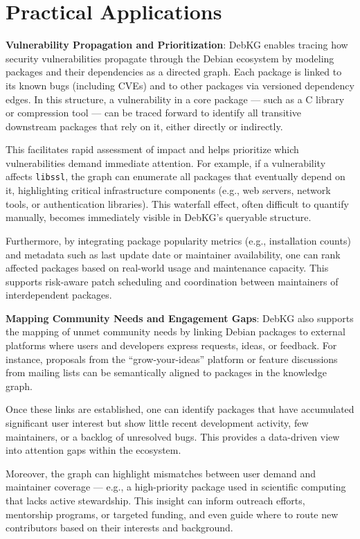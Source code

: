 \documentclass[10pt,oneside,a4paper, twocolumn]{article}
\begin{document}
    \section{Practical Applications}


    {\bf Vulnerability Propagation and Prioritization}: DebKG enables tracing how security vulnerabilities propagate through the Debian ecosystem by modeling packages and their dependencies as a directed graph. Each package is linked to its known bugs (including CVEs) and to other packages via versioned dependency edges. In this structure, a vulnerability in a core package — such as a C library or compression tool — can be traced forward to identify all transitive downstream packages that rely on it, either directly or indirectly.

    This facilitates rapid assessment of impact and helps prioritize which vulnerabilities demand immediate attention. For example, if a vulnerability affects \texttt{libssl}, the graph can enumerate all packages that eventually depend on it, highlighting critical infrastructure components (e.g., web servers, network tools, or authentication libraries). This waterfall effect, often difficult to quantify manually, becomes immediately visible in DebKG’s queryable structure.

    Furthermore, by integrating package popularity metrics (e.g., installation counts) and metadata such as last update date or maintainer availability, one can rank affected packages based on real-world usage and maintenance capacity. This supports risk-aware patch scheduling and coordination between maintainers of interdependent packages.

        {\bf Mapping Community Needs and Engagement Gaps}: DebKG also supports the mapping of unmet community needs by linking Debian packages to external platforms where users and developers express requests, ideas, or feedback. For instance, proposals from the “grow-your-ideas” platform or feature discussions from mailing lists can be semantically aligned to packages in the knowledge graph.

    Once these links are established, one can identify packages that have accumulated significant user interest but show little recent development activity, few maintainers, or a backlog of unresolved bugs. This provides a data-driven view into attention gaps within the ecosystem.

    Moreover, the graph can highlight mismatches between user demand and maintainer coverage — e.g., a high-priority package used in scientific computing that lacks active stewardship.
    This insight can inform outreach efforts, mentorship programs, or targeted funding, and even guide where to route new contributors based on their interests and background.
\end{document}
